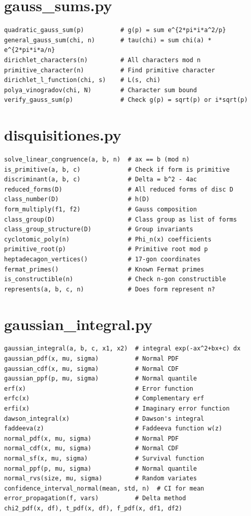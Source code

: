 \section{gauss\_sums.py}

\begin{lstlisting}[style=python]
quadratic_gauss_sum(p)          # g(p) = sum e^{2*pi*i*a^2/p}
general_gauss_sum(chi, n)       # tau(chi) = sum chi(a) * e^{2*pi*i*a/n}
dirichlet_characters(n)         # All characters mod n
primitive_character(n)          # Find primitive character
dirichlet_l_function(chi, s)    # L(s, chi)
polya_vinogradov(chi, N)        # Character sum bound
verify_gauss_sum(p)             # Check g(p) = sqrt(p) or i*sqrt(p)
\end{lstlisting}

\section{disquisitiones.py}

\begin{lstlisting}[style=python]
solve_linear_congruence(a, b, n)  # ax == b (mod n)
is_primitive(a, b, c)             # Check if form is primitive
discriminant(a, b, c)             # Delta = b^2 - 4ac
reduced_forms(D)                  # All reduced forms of disc D
class_number(D)                   # h(D)
form_multiply(f1, f2)             # Gauss composition
class_group(D)                    # Class group as list of forms
class_group_structure(D)          # Group invariants
cyclotomic_poly(n)                # Phi_n(x) coefficients
primitive_root(p)                 # Primitive root mod p
heptadecagon_vertices()           # 17-gon coordinates
fermat_primes()                   # Known Fermat primes
is_constructible(n)               # Check n-gon constructible
represents(a, b, c, n)            # Does form represent n?
\end{lstlisting}

\section{gaussian\_integral.py}

\begin{lstlisting}[style=python]
gaussian_integral(a, b, c, x1, x2)  # integral exp(-ax^2+bx+c) dx
gaussian_pdf(x, mu, sigma)          # Normal PDF
gaussian_cdf(x, mu, sigma)          # Normal CDF
gaussian_ppf(p, mu, sigma)          # Normal quantile
erf(x)                              # Error function
erfc(x)                             # Complementary erf
erfi(x)                             # Imaginary error function
dawson_integral(x)                  # Dawson's integral
faddeeva(z)                         # Faddeeva function w(z)
normal_pdf(x, mu, sigma)            # Normal PDF
normal_cdf(x, mu, sigma)            # Normal CDF
normal_sf(x, mu, sigma)             # Survival function
normal_ppf(p, mu, sigma)            # Normal quantile
normal_rvs(size, mu, sigma)         # Random variates
confidence_interval_normal(mean, std, n)  # CI for mean
error_propagation(f, vars)          # Delta method
chi2_pdf(x, df), t_pdf(x, df), f_pdf(x, df1, df2)
\end{lstlisting}


